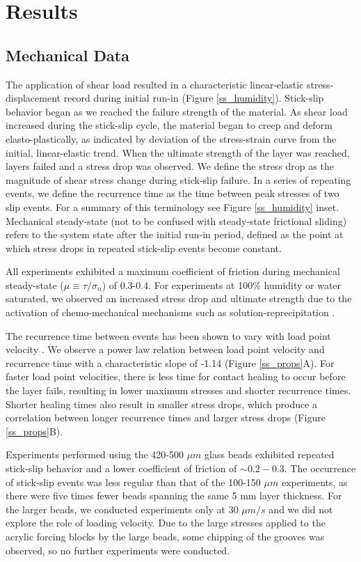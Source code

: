 \section{Results}

\subsection{Mechanical Data}
The application of shear load resulted in a characteristic linear-elastic stress-displacement record during initial run-in (Figure \ref{ss_humidity}).  Stick-slip behavior began as we reached the failure strength of the material.  As shear load increased during the stick-slip cycle, the material began to creep and deform elasto-plastically, as indicated by deviation of the stress-strain curve from the initial, linear-elastic trend.  When the ultimate strength of the layer was reached, layers failed and a stress drop was observed.  We define the stress drop as the magnitude of shear stress change during stick-slip failure.  In a series of repeating events, we define the recurrence time as the time between peak stresses of two slip events.  For a summary of this terminology see Figure \ref{ss_humidity} inset.  Mechanical steady-state (not to be confused with steady-state frictional sliding) refers to the system state after the initial run-in period, defined as the point at which stress drops in repeated stick-slip events become constant.

All experiments exhibited a maximum coefficient of friction during mechanical steady-state ($\mu \equiv \tau / \sigma_n$) of 0.3-0.4.  For experiments at 100\% humidity or water saturated, we observed an increased stress drop and ultimate strength due to the activation of chemo-mechanical mechanisms such as solution-reprecipitation \citep{Frye:2002jj, Yasuhara:2005ku, Scuderi:2013}.

The recurrence time between events has been shown to vary with load point velocity \citep{Karner:2000tj,Beeler:2001tj}.  We observe a power law relation between load point velocity and recurrence time with a characteristic slope of -1.14 (Figure \ref{ss_props}A).  For faster load point velocities, there is less time for contact healing to occur before the layer fails, resulting in lower maximum stresses and shorter recurrence times.  Shorter healing times also result in smaller stress drops, which produce a correlation between longer recurrence times and larger stress drops (Figure \ref{ss_props}B).  

Experiments performed using the 420-500 $\mu m$ glass beads exhibited repeated stick-slip behavior and a lower coefficient of friction of $\sim 0.2-0.3$.  The occurrence of stick-slip events was less regular than that of the 100-150 $\mu m$ experiments, as there were five times fewer beads spanning the same 5 mm layer thickness.  For the larger beads, we conducted experiments only at 30 $\mu m/s$ and we did not explore the role of loading velocity.  Due to the large stresses applied to the acrylic forcing blocks by the large beads, some chipping of the grooves was observed, so no further experiments were conducted. 

